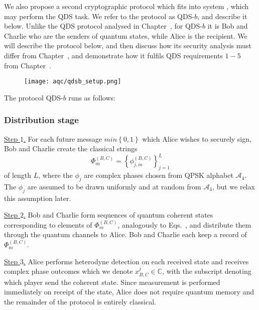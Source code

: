 We also propose a second cryptographic protocol which fits into system \systemB, which may perform the QDS task. We refer to the protocol as QDS-$b$, and describe it below. Unlike the QDS protocol analysed in Chapter~, for QDS-$b$ it is Bob and Charlie who are the senders of quantum states, while Alice is the recipient. We will describe the protocol below, and then discuss how its security analysis must differ from Chapter~, and demonstrate how it fulfils QDS requirements $1-5$ from Chapter~.


\begin{figure}[htp]
\centering
\texttt{[image: aqc/qdsb\_setup.png]}
\caption{\label{fig:qdsb_setup}}
\end{figure}

The protocol QDS-$b$ runs as follows:

\subsubsection*{Distribution stage}

\noindent \underline{Step $1$.} For each future message $m in \left\{0, 1\right\}$ which Alice wishes to securely sign, Bob and Charlie create the classical strings
\begin{equation}
\Phi_m^{\left(B, C\right)} = \left\{\phi_{j, m}^{\left(B, C\right)}\right\}_{j=1}^L
\end{equation}
of length $L$, where the $\phi_j$ are complex phases chosen from QPSK alphabet $\mathcal{A}_4$. The $\phi_j$ are assumed to be drawn uniformly and at random from $\mathcal{A}_4$, but we relax this assumption later. 


\noindent \underline{Step $2$.} Bob and Charlie form sequences of quantum coherent states corresponding to elements of $\Phi_m^{\left(B, C\right)}$, analogously to Eqs.~, and distribute them through the quantum channels to Alice. Bob and Charlie each keep a record of $\Phi_m^{\left(B, C\right)}$.

\noindent \underline{Step $3$.} Alice performs heterodyne detection on each received state and receives complex phase outcomes which we denote $x_{B, C}^j \in \mathbb{C}$, with the subscript denoting which player send the coherent state. Since measurement is performed immediately on receipt of the state, Alice does not require quantum memory and the remainder of the protocol is entirely classical.

